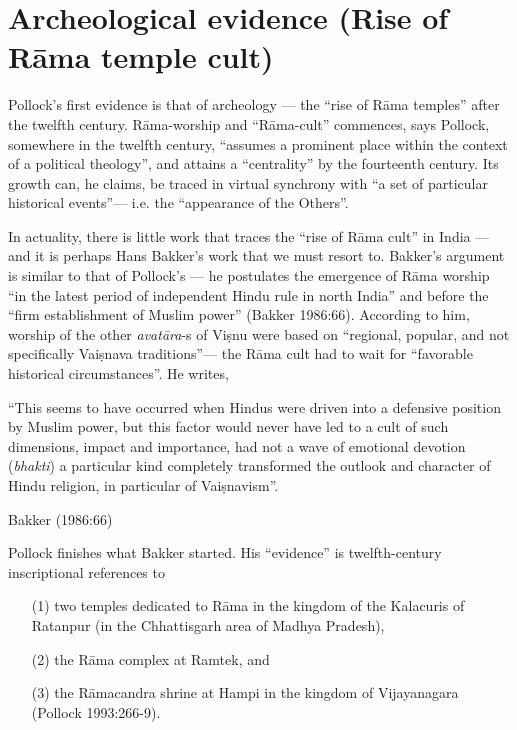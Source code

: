 \newpage

\section{Archeological evidence (Rise of Rāma temple cult)}\label{sec3.1}

Pollock’s first evidence is that of archeology — the “rise of Rāma temples” after the twelfth century. Rāma-worship and “Rāma-cult” commences, says Pollock, somewhere in the twelfth century, “assumes a prominent place within the context of a political theology”, and attains a “centrality” by the fourteenth century. Its growth can, he claims, be traced in virtual synchrony with “a set of particular historical events”— i.e. the “appearance of the Others”. 

In actuality, there is little work that traces the “rise of Rāma cult” in India — and it is perhaps Hans Bakker’s work that we must resort to. Bakker’s argument is similar to that of Pollock’s — he postulates the emergence of Rāma worship “in the latest period of independent Hindu rule in north India” and before the “firm establishment of Muslim power” (Bakker 1986:66). According to him, worship of the other {\sl avatāra}-s of Viṣnu were based on “regional, popular, and not specifically Vaiṣnava traditions”— the Rāma cult had to wait for “favorable historical circumstances”. He writes,  

\begin{myquote}
“This seems to have occurred when Hindus were driven into a defensive position by Muslim power, but this factor would never have led to a cult of such dimensions, impact and importance, had not a wave of emotional devotion ({\sl bhakti}) a particular kind completely transformed the outlook and character of Hindu religion, in particular of Vaiṣnavism”.

\hfill Bakker (1986:66)
\end{myquote}

Pollock finishes what Bakker started. His “evidence” is twelfth-century inscriptional references to 

\begin{itemize}
\item[(1)] two temples dedicated to Rāma in the kingdom of the Kalacuris of Ratanpur (in the Chhattisgarh area of Madhya Pradesh), 

\item[(2)] the Rāma complex at Ramtek, and 

\item[(3)] the Rāmacandra shrine at Hampi in the kingdom of Vijayanagara  (Pollock 1993:266-9). 
\end{itemize}

